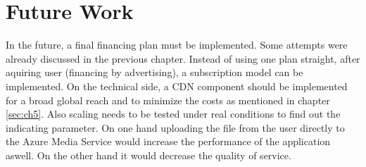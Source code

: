 \section{Future Work}\label{sec:ch6}

In the future, a final financing plan must be implemented. Some attempts were already discussed in the previous chapter. Instead of using one plan straight, after aquiring user (financing by advertising), a subscription model can be implemented. 
On the technical side, a CDN component should be implemented for a broad global reach and to minimize the costs as mentioned in chapter \ref{sec:ch5}. Also scaling needs to be tested under real conditions to find out the indicating parameter.
On one hand uploading the file from the user directly to the Azure Media Service would increase the performance of the application aswell. On the other hand it would decrease the quality of service.